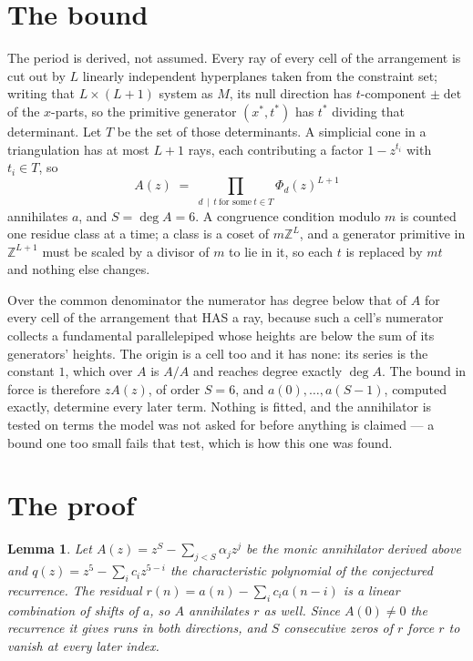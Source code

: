 \documentclass[11pt,a4paper]{article}
\theoremstyle{plain}
\newtheorem{lemma}[theorem]{Lemma}
\theoremstyle{definition}
\begin{document}
\section{The bound}

The period is derived, not assumed. Every ray of every cell of the arrangement is cut out by
$L$ linearly independent hyperplanes taken from the constraint set; writing that $L\times(L+1)$
system as $M$, its null direction has $t$-component $\pm\det$ of the $x$-parts, so the
primitive generator $(x^*,t^*)$ has $t^*$ dividing that determinant. Let $T$ be the set of
those determinants. A simplicial cone in a triangulation has at most $L+1$ rays, each
contributing a factor $1-z^{t_i}$ with $t_i\in T$, so
\[
A(z)\;=\;\prod_{d\,\mid\,t\ \text{for some}\ t\in T}\Phi_d(z)^{L+1}
\]
annihilates $a$, and $S=\deg A=6$. A congruence condition modulo $m$ is counted one residue
class at a time; a class is a coset of $m\mathbb{Z}^L$, and a generator primitive in
$\mathbb{Z}^{L+1}$ must be scaled by a divisor of $m$ to lie in it, so each $t$ is replaced
by $mt$ and nothing else changes.

Over the common denominator the numerator has degree below that of $A$ for every cell of the
arrangement that HAS a ray, because such a cell's numerator collects a fundamental
parallelepiped whose heights are below the sum of its generators' heights. The origin is a cell
too and it has none: its series is the constant $1$, which over $A$ is $A/A$ and reaches degree
exactly $\deg A$. The bound in force is therefore $zA(z)$, of order $S=6$, and
$a(0),\dots,a(S-1)$, computed exactly, determine every later term. Nothing is fitted, and the
annihilator is tested on terms the model was not asked for before anything is claimed --- a
bound one too small fails that test, which is how this one was found.

\section{The proof}

\begin{lemma}\label{lem:crit}
Let $A(z)=z^S-\sum_{j<S}\alpha_jz^{j}$ be the monic annihilator derived above and
$q(z)=z^{5}-\sum_ic_iz^{5-i}$ the characteristic polynomial of the conjectured
recurrence. The residual $r(n)=a(n)-\sum_ic_ia(n-i)$ is a linear combination of shifts of $a$,
so $A$ annihilates $r$ as well. Since $A(0)\ne0$ the recurrence it gives runs in both
directions, and $S$ consecutive zeros of $r$ force $r$ to vanish at every later index.
\end{lemma}
\end{document}
